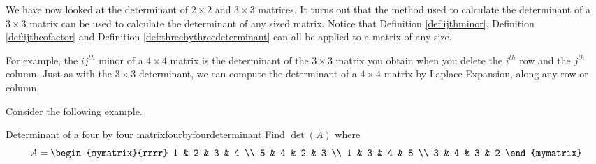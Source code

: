 We have now looked at the determinant of $2 \times 2$ and $3 \times 3$ matrices. It turns
out that the method used to calculate the determinant of a $3 \times 3$ matrix 
can be used to calculate the determinant of any sized matrix. Notice that
Definition \ref{def:ijthminor}, Definition \ref{def:ijthcofactor} and Definition \ref{def:threebythreedeterminant}
can all be applied to a matrix of any size. 

For example, the $ij^{th}$ minor of a $4 \times 4$ matrix is the determinant
of the $3 \times 3$ matrix you obtain when you delete the $i^{th}$ row and the $j^{th}$ column. 
Just as with the $3 \times 3$ determinant, we can compute the determinant of a $4 \times 4$ matrix by Laplace Expansion, 
along any row or column

Consider the following example. 

\begin{example}{Determinant of a four by four matrix}{fourbyfourdeterminant}
Find $\det \left( A\right) $ where
\begin{equation*}
A=\begin{mymatrix}{rrrr}
1 & 2 & 3 & 4 \\
5 & 4 & 2 & 3 \\
1 & 3 & 4 & 5 \\
3 & 4 & 3 & 2
\end{mymatrix}
\end{equation*}
\end{example}

